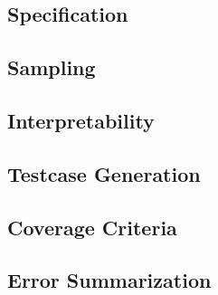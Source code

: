 \subsection{Specification}

\subsection{Sampling}

\subsection{Interpretability}

\subsection{Testcase Generation}

\subsection{Coverage Criteria}

\subsection{Error Summarization}

